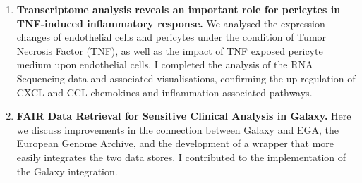 \begin{enumerate}[label=\ref*{chapter:clinic}.\arabic*]
\itemsep-0.5em
\setcounter{enumi}{-1}
\item \textbf{\color{hexy-red}Transcriptome analysis reveals an important role for pericytes in TNF-induced inflammatory response.} We analysed the expression changes of endothelial cells and pericytes under the condition of Tumor Necrosis Factor (TNF), as well as the impact of TNF exposed pericyte medium upon endothelial cells. I completed the analysis of the RNA Sequencing data and associated visualisations, confirming the up-regulation of CXCL and CCL chemokines and inflammation associated pathways.

\item \textbf{\color{hexy-red}FAIR Data Retrieval for Sensitive Clinical Analysis in Galaxy.} Here we discuss improvements in the connection between Galaxy and EGA, the European Genome Archive, and the development of a wrapper that more easily integrates the two data stores. I contributed to the implementation of the Galaxy integration.


\end{enumerate}
